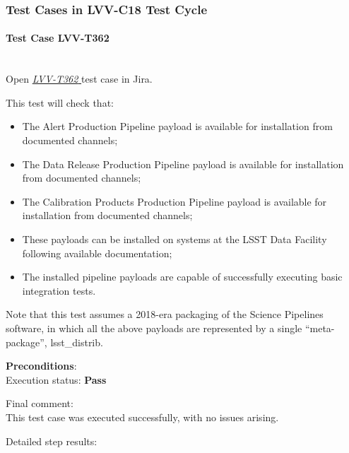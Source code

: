 \documentclass[DM,lsstdraft,STR,toc]{lsstdoc}
\providecommand{\tightlist}{
  \setlength{\itemsep}{0pt}\setlength{\parskip}{0pt}}
\begin{document}
  \subsubsection{Test Cases in LVV-C18 Test Cycle}


    \paragraph{Test Case LVV-T362 }\mbox{}\\

Open  \href{https://jira.lsstcorp.org/secure/Tests.jspa#/testCase/LVV-T362}{\textit{ LVV-T362 } }
test case in Jira.

    This test will check that:

\begin{itemize}
\tightlist
\item
  The Alert Production Pipeline payload is available for installation
  from documented channels;
\item
  The Data Release Production Pipeline payload is available for
  installation from documented channels;
\item
  The Calibration Products Production Pipeline payload is available for
  installation from documented channels;
\item
  These payloads can be installed on systems at the LSST Data Facility
  following available documentation;
\item
  The installed pipeline payloads are capable of successfully executing
  basic integration tests.
\end{itemize}

Note that this test assumes a 2018-era packaging of the Science
Pipelines software, in which all the above payloads are represented by a
single ``meta-package'', lsst\_distrib.


    {\bf Preconditions}:\\
    

    Execution status: {\bf Pass }

    Final comment:\\This test case was executed successfully, with no issues arising.



    Detailed step results:
\end{document}
